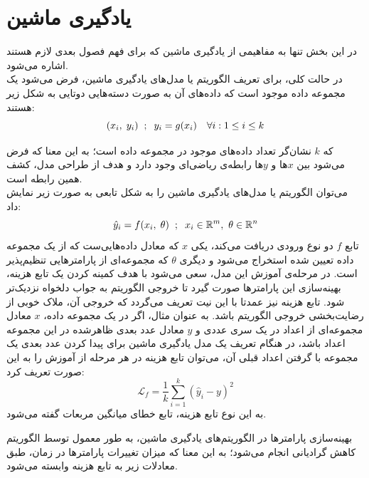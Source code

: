 
\section{یادگیری ماشین}
در این بخش تنها به مفاهیمی از یادگیری ماشین که برای فهم فصول بعدی لازم هستند اشاره می‌شود. \\
در حالت کلی، برای تعریف الگوریتم یا مدل‌های یادگیری ماشین، فرض می‌شود یک مجموعه داده موجود است که داده‌های آن به صورت دسته‌هایی دوتایی به شکل زیر هستند:
\begin{equation}
    (x_i, \hspace{1mm} y_i) \hspace{2mm} ; \hspace{2mm} y_i = g(x_i) \quad  \forall i : 1 \leq i \leq k
\end{equation}

که
$k$
نشان‌گر تعداد داده‌های موجود در مجموعه داده است؛
به این معنا که فرض می‌شود بین 
$x$ها
و
$y$ها
رابطه‌ی ریاضی‌ای وجود دارد و هدف از طراحی مدل، کشف همین رابطه است. \\
می‌توان الگوریتم یا مدل‌های یادگیری ماشین را به شکل تابعی به صورت زیر نمایش داد:
\begin{equation}
    \Hat{y}_i = f(x_i, \hspace{1mm} \theta) \hspace{2mm} ; \hspace{2mm} x_i \in \mathbb{R}^m, \hspace{1.2mm} \theta \in \mathbb{R}^n
\end{equation}
تابع
$f$
دو نوع ورودی دریافت می‌کند، یکی
$x$
که معادل داده‌هایی‌ست که از یک مجموعه داده تعیین شده استخراج می‌شود و دیگری
$\theta$
که مجموعه‌ای از پارامترهایی تنظیم‌پذیر است. در مرحله‌ی آموزش این مدل، سعی می‌شود با هدف کمینه کردن یک تابع هزینه، بهینه‌سازی این پارامترها صورت گیرد تا خروجی الگوریتم به جواب دلخواه نزدیک‌تر شود.
تابع هزینه نیز عمدتا با این نیت تعریف می‌گردد که خروجی آن، ملاک خوبی از رضایت‌بخشی خروجی الگوریتم باشد. به عنوان مثال، اگر در یک مجموعه داده،
$x$
معادل مجموعه‌ای از اعداد در یک سری عددی
و
$y$
معادل عدد بعدی ظاهرشده در این مجموعه اعداد باشد، در هنگام تعریف یک مدل یادگیری ماشین برای پیدا کردن عدد بعدی یک مجموعه با گرفتن اعداد قبلی آن، می‌توان تابع هزینه در هر مرحله از آموزش را به این صورت تعریف کرد:
\begin{equation} \label{eqn:mse}
    \mathcal{L}_f = \frac{1}{k} \sum_{i=1}^{k} (\hat{y}_i - y)^2
\end{equation}
\hsm
به این نوع تابع هزینه، تابع خطای میانگین مربعات گفته می‌شود.

بهینه‌سازی پارامترها در الگوریتم‌های یادگیری ماشین، به طور معمول توسط الگوریتم کاهش گرادیانی
انجام می‌شود؛ به این معنا که میزان تغییرات پارامترها در زمان، طبق معادلات زیر به تابع هزینه وابسته می‌شود.

